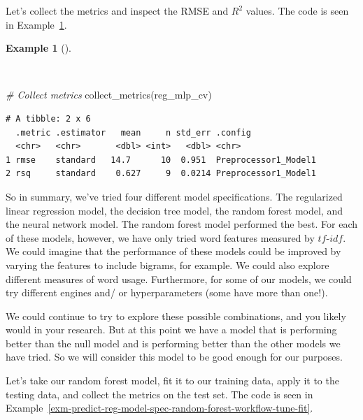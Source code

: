 \documentclass[
  letterpaper,
  krantz1]{latex/krantz-mod}
\newenvironment{Shaded}{\begin{snugshade}}{\end{snugshade}}
\newcommand{\CommentTok}[1]{\textcolor[rgb]{0.00,0.00,0.00}{\textit{#1}}}
\newcommand{\FunctionTok}[1]{\textcolor[rgb]{0.00,0.00,0.00}{#1}}
\newcommand{\NormalTok}[1]{\textcolor[rgb]{0.00,0.00,0.00}{#1}}
\theoremstyle{definition}
\theoremstyle{definition}
\newtheorem{example}{Example}[chapter]
\theoremstyle{remark}
\begin{document}
Let's collect the metrics and inspect the RMSE and \(R^2\) values. The
code is seen in Example~\ref{exm-predict-reg-metrics-mlp}.

\begin{example}[]\protect\hypertarget{exm-predict-reg-metrics-mlp}{}\label{exm-predict-reg-metrics-mlp}

~

\begin{Shaded}
\begin{Highlighting}[numbers=left,,]
\CommentTok{\# Collect metrics}
\FunctionTok{collect\_metrics}\NormalTok{(reg\_mlp\_cv)}
\end{Highlighting}
\end{Shaded}

\begin{verbatim}
# A tibble: 2 x 6
  .metric .estimator   mean     n std_err .config             
  <chr>   <chr>       <dbl> <int>   <dbl> <chr>               
1 rmse    standard   14.7      10  0.951  Preprocessor1_Model1
2 rsq     standard    0.627     9  0.0214 Preprocessor1_Model1
\end{verbatim}

\end{example}

So in summary, we've tried four different model specifications. The
regularized linear regression model, the decision tree model, the random
forest model, and the neural network model. The random forest model
performed the best. For each of these models, however, we have only
tried word features measured by
\(tf\)-\(idf\).
We could imagine that the performance of these models could be improved
by varying the features to include bigrams, for example.
We could also explore different measures of word usage. Furthermore, for
some of our models, we could try different engines and/ or
hyperparameters (some have more than one!).

We could continue to try to explore these possible combinations, and you
likely would in your research. But at this point we have a model that is
performing better than the null model and is performing better than the
other models we have tried. So we will consider this model to be good
enough for our purposes.

Let's take our random forest model, fit it to our
training data, apply it to the testing data, and collect the metrics on
the test set. The code is seen in
Example~\ref{exm-predict-reg-model-spec-random-forest-workflow-tune-fit}.
\end{document}
